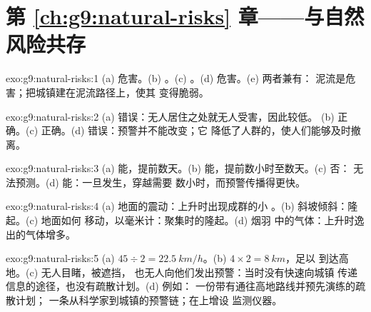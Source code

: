 \section*{第 \ref{ch:g9:natural-risks} 章——与自然风险共存}

\begin{solution}{exo:g9:natural-risks:1}
(a) 危害。(b) 。(c) 。(d) 危害。(e) 两者兼有：
泥流是危害；把城镇建在泥流路径上，使其
变得脆弱。
\end{solution}

\begin{solution}{exo:g9:natural-risks:2}
(a) 错误：无人居住之处就无人受害，因此较低。
(b) 正确。(c) 正确。(d) 错误：预警并不能改变；它
降低了人群的，使人们能够及时撤离。
\end{solution}

\begin{solution}{exo:g9:natural-risks:3}
(a) 能，提前数天。(b) 能，提前数小时至数天。(c) 否：
无法预测。(d) 能：一旦发生，穿越需要
数小时，而预警传播得更快。
\end{solution}

\begin{solution}{exo:g9:natural-risks:4}
(a) 地面的震动：上升时出现成群的小
。(b) 斜坡倾斜：隆起。(c) 地面如何
移动，以毫米计：聚集时的隆起。(d) 烟羽
中的气体：上升时逸出的气体增多。
\end{solution}

\begin{solution}{exo:g9:natural-risks:5}
(a) $45 \div 2 = \qty{22.5}{km/h}$。(b) $4 \times 2 = \qty{8}{km}$，足以
到达高地。(c) 无人目睹，被遮挡，
也无人向他们发出预警：当时没有快速向城镇
传递信息的途径，也没有疏散计划。(d) 例如：
一份带有通往高地路线并预先演练的疏散计划；
一条从科学家到城镇的预警链；在上增设
监测仪器。
\end{solution}


